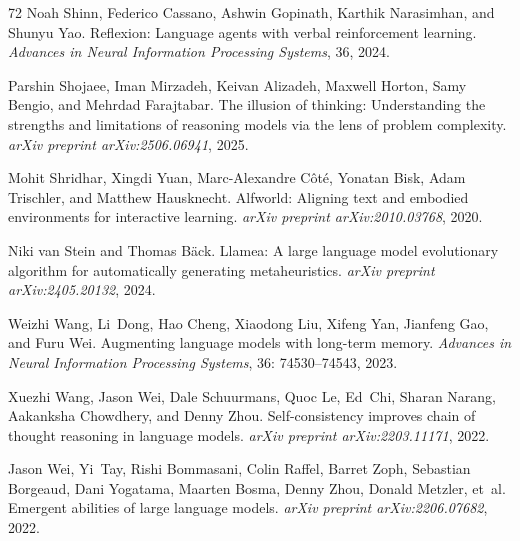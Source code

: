 \begin{thebibliography}{72}
Noah Shinn, Federico Cassano, Ashwin Gopinath, Karthik Narasimhan, and Shunyu Yao.
\newblock Reflexion: Language agents with verbal reinforcement learning.
\newblock \emph{Advances in Neural Information Processing Systems}, 36, 2024.

Parshin Shojaee, Iman Mirzadeh, Keivan Alizadeh, Maxwell Horton, Samy Bengio, and Mehrdad Farajtabar.
\newblock The illusion of thinking: Understanding the strengths and limitations of reasoning models via the lens of problem complexity.
\newblock \emph{arXiv preprint arXiv:2506.06941}, 2025.

Mohit Shridhar, Xingdi Yuan, Marc-Alexandre C{\^o}t{\'e}, Yonatan Bisk, Adam Trischler, and Matthew Hausknecht.
\newblock Alfworld: Aligning text and embodied environments for interactive learning.
\newblock \emph{arXiv preprint arXiv:2010.03768}, 2020.

Niki van Stein and Thomas B{\"a}ck.
\newblock Llamea: A large language model evolutionary algorithm for automatically generating metaheuristics.
\newblock \emph{arXiv preprint arXiv:2405.20132}, 2024.

Weizhi Wang, Li~Dong, Hao Cheng, Xiaodong Liu, Xifeng Yan, Jianfeng Gao, and Furu Wei.
\newblock Augmenting language models with long-term memory.
\newblock \emph{Advances in Neural Information Processing Systems}, 36: 74530--74543, 2023.

Xuezhi Wang, Jason Wei, Dale Schuurmans, Quoc Le, Ed~Chi, Sharan Narang, Aakanksha Chowdhery, and Denny Zhou.
\newblock Self-consistency improves chain of thought reasoning in language models.
\newblock \emph{arXiv preprint arXiv:2203.11171}, 2022.

Jason Wei, Yi~Tay, Rishi Bommasani, Colin Raffel, Barret Zoph, Sebastian Borgeaud, Dani Yogatama, Maarten Bosma, Denny Zhou, Donald Metzler, et~al.
\newblock Emergent abilities of large language models.
\newblock \emph{arXiv preprint arXiv:2206.07682}, 2022{}.


\end{thebibliography}
